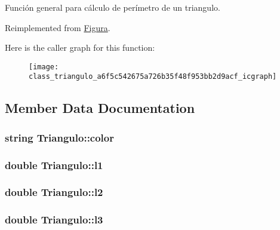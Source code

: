 Función general para cálculo de perímetro de un triangulo. 



Reimplemented from \hyperlink{class_figura_a7451dfc1da3533fa15205df11afe7ac3}{Figura}.



Here is the caller graph for this function\+:
\nopagebreak
\begin{figure}[H]
\begin{center}
\leavevmode
\texttt{[image: class\_triangulo\_a6f5c542675a726b35f48f953bb2d9acf\_icgraph]}
\end{center}
\end{figure}




\subsection{Member Data Documentation}
\hypertarget{class_triangulo_a437071d8f69923add54c5bedb74cce10}{
\subsubsection[{color}]{\setlength{\rightskip}{0pt plus 5cm}string Triangulo\+::color}}\label{class_triangulo_a437071d8f69923add54c5bedb74cce10}
\hypertarget{class_triangulo_a94ad3aafb95afd65f39dabc310b76209}{
\subsubsection[{l1}]{\setlength{\rightskip}{0pt plus 5cm}double Triangulo\+::l1}}\label{class_triangulo_a94ad3aafb95afd65f39dabc310b76209}
\hypertarget{class_triangulo_a3aaa40dc5acbbd4079362c71a03cf016}{
\subsubsection[{l2}]{\setlength{\rightskip}{0pt plus 5cm}double Triangulo\+::l2}}\label{class_triangulo_a3aaa40dc5acbbd4079362c71a03cf016}
\hypertarget{class_triangulo_aed89ff9f36a51cb7860f3175384c02eb}{
\subsubsection[{l3}]{\setlength{\rightskip}{0pt plus 5cm}double Triangulo\+::l3}}\label{class_triangulo_aed89ff9f36a51cb7860f3175384c02eb}
